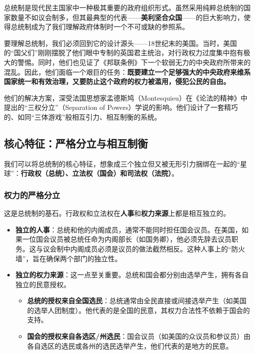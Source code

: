 总统制是现代民主国家中一种极其重要的政府组织形式。虽然采用纯粹总统制的国家数量不如议会制多，但其最典型的代表——\textbf{美利坚合众国}——的巨大影响力，使得总统制成为了我们理解政府体制时一个不可或缺的参照系。

要理解总统制，我们必须回到它的设计源头——18世纪末的美国。当时，美国的“国父们”刚刚摆脱了他们眼中专制的英国君主统治，对行政权力过度集中抱有极大的警惕。同时，他们也见证了《邦联条例》下一个软弱无力的中央政府所带来的混乱。因此，他们面临一个艰巨的任务：\textbf{既要建立一个足够强大的中央政府来维系国家统一和有效治理，又要防止这个政府的权力被滥用，侵犯公民的自由。}

他们的解决方案，深受法国思想家孟德斯鸠（Montesquieu）在《论法的精神》中提出的“三权分立”（Separation of Powers）学说的影响。他们设计了一套精巧的、如同“三体游戏”般相互引力、相互制衡的系统。

\subsection{核心特征：严格分立与相互制衡}

我们可以将总统制的核心特征，想象成三个独立但又被无形引力捆绑在一起的“星球”：\textbf{行政权（总统）、立法权（国会）和司法权（法院）}。

\subsubsection*{权力的严格分立}

这是总统制的基石。行政权和立法权在\textbf{人事}和\textbf{权力来源}上都是相互独立的。

\begin{itemize}
    \item \textbf{独立的人事}：总统和他的内阁成员，通常不能同时担任国会议员。在美国，如果一位国会议员被总统任命为内阁部长（如国务卿），他必须先辞去议员职务。这与议会制中内阁成员必须是议员的做法截然相反。这种人事上的“防火墙”，旨在确保两个部门的独立性。
    \item \textbf{独立的权力来源}：这一点至关重要。总统和国会都分别由选举产生，拥有各自独立的民意授权。
    \begin{itemize}
        \item \textbf{总统的授权来自全国选民}：总统通常由全民直接或间接选举产生（如美国的选举人团制度）。他代表的是全国的民意，其权力合法性不依赖于国会的支持。
        \item \textbf{国会的授权来自各选区/州选民}：国会议员（如美国的众议员和参议员）由各自选区的选民或各州的选民选举产生，他们代表的是地方的民意。
    \end{itemize}
\end{itemize}

